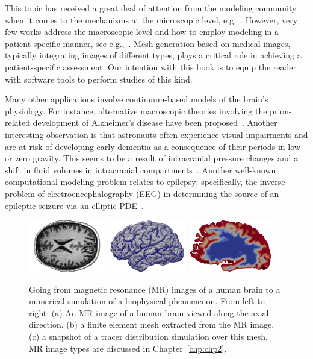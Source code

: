 This topic has received a great deal of attention from the modeling
community when it comes to the mechanisms at the microscopic level,
e.g.~\cite{aldea2019cerebrovascular, daversin2020mechanisms,
  diem2017arterial, holter2017interstitial, ray2019analysis,
  sharp2019dispersion, smith2017test}. However, very few works address
the macroscopic level and how to employ modeling in a patient-specific
manner, see e.g.,~\cite{chou2016fully, lee2019mixed}. Mesh generation
based on medical images, typically integrating images of different
types, plays a critical role in achieving a patient-specific
assessment. Our intention with this book is to equip the reader with
software tools to perform studies of this kind.

Many other applications involve continuum-based models of the brain's
physiology.  For instance, alternative macroscopic theories involving
the prion-related development of Alzheimer's disease have been
proposed~\cite{fornari2019prion, kevrekidis2020anisotropic}. Another
interesting observation is that astronauts often experience visual
impairments and are at risk of developing early dementia as a
consequence of their periods in low or zero gravity. This seems to be
a result of intracranial pressure changes and a shift in fluid volumes
in intracranial compartments~\cite{alperin2018spaceflight}.  Another
well-known computational modeling problem relates to epilepsy:
specifically, the inverse problem of electroencephalography (EEG) in
determining the source of an epileptic seizure via an elliptic
PDE~\cite{grech2008review}.

\begin{figure}
  \begin{center}
  \includegraphics[height=2.3cm]{./graphics/chp1/T1-image-rot-white}
  \includegraphics[height=2.3cm]{./graphics/chp1/ernie-volume-64}
  \includegraphics[height=2.3cm]{./graphics/chp1/soltn-t30-crop}
  \hfill
  \end{center}
  \caption{Going from magnetic resonance (MR) images of a human brain
    to a numerical simulation of a biophysical phenomenon. From left
    to right: (a) An MR image of a human brain viewed along the axial
    direction, (b) a finite element mesh extracted from the MR image,
    (c) a snapshot of a tracer distribution simulation over this
    mesh. MR image types are discussed in Chapter~\ref{chp:chp2}.}
  \label{fig:chp1:pipeline}
\end{figure}

